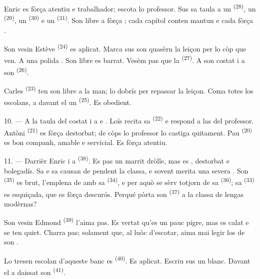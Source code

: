 Enric es fòrça atentiu e trabalhador; escota lo professor. Sus sa taula a un
 \textsuperscript{(28)}, un  \textsuperscript{(29)},
un  \textsuperscript{(30)} e un 
\textsuperscript{(31)}. Son libre a fòrça ; cada capítol conten
mantun  e cada  fòrça .

Son vesin Estève \textsuperscript{(24)} es aplicat. Marca sus son quasèrn la
leiçon per lo còp que ven. A una polida . Son libre es barrat.
Vesèm pas que la  \textsuperscript{(27)}. A son costat i a son
 \textsuperscript{(26)}.

Carles \textsuperscript{(23)} ten son libre a la man; lo dobrís per repassar la
leiçon. Coma totes los escolans, a davant el un 
\textsuperscript{(25)}. Es obedient.

10. --- A la taula del costat i a  e . Loís
recita sa  \textsuperscript{(22)} e respond a las
 del professor. Antòni \textsuperscript{(21)} es fòrça
destorbat; de còps lo professor lo castiga quitament. Pau
\textsuperscript{(20)} es bon companh, amable e servicial. Es fòrça atentiu.

\VUsaut{4.2mm}
\VUsaut{3.2mm}

11. --- Darrièr Enric i a  \textsuperscript{(38)}. Es pas un marrit
dròlle, mas es , destorbat e bolegadís. Sa
 e sa  causan de 
pendent la classa, e sovent merita una severa . Son
 \textsuperscript{(35)} es brut, l'emplena de
 amb sa  \textsuperscript{(34)}, e per aquò
se sèrv totjorn de sa  \textsuperscript{(36)}; sa
 \textsuperscript{(33)} es esquiçada, que es fòrça descurós.
Perqué pòrta son  \textsuperscript{(37)} a la classa de lengas
modèrnas?

Son vesin Edmond \textsuperscript{(39)} l'aima pas. Es vertat qu'es un pauc
pigre, mas es calat e se ten quiet. Charra pas; solament que, al luòc
d'escotar, aima mai legir los  de son .

Lo tresen escolan d'aqueste banc es  \textsuperscript{(40)}. Es
aplicat. Escriu sus un  blanc. Davant el a daissat son
 \textsuperscript{(41)}.

